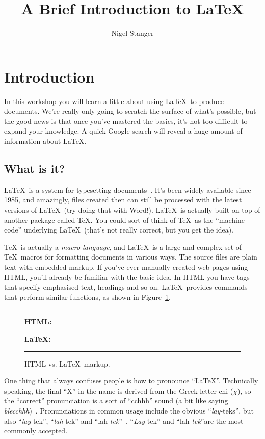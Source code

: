 \documentclass[12pt,a4paper,pdftex]{article}
\title{A Brief Introduction to \LaTeX}
\author{Nigel Stanger}
\begin{document}
\maketitle


\section{Introduction}
\label{sec:intro}

In this workshop you will learn a little about using \LaTeX\ to produce
documents. We're really only going to scratch the surface of what's
possible, but the good news is that once you've mastered the basics,
it's not too difficult to expand your knowledge. A quick Google search
will reveal a huge amount of information about \LaTeX.


\subsection{What is it?}
\label{sec:what}

\LaTeX\ is a system for typesetting documents~\cite{UsersGuide}. It's
been widely available since 1985, and amazingly, files created then can
still be processed with the latest versions of \LaTeX\ (try doing that
with Word!). \LaTeX\ is actually built on top of another package called
\TeX. You could sort of think of \TeX\ as the ``machine code''
underlying \LaTeX\ (that's not really correct, but you get the idea).

\TeX\ is actually a \emph{macro language}, and \LaTeX\ is a large and
complex set of \TeX\ macros for formatting documents in various ways.
The source files are plain text with embedded markup. If you've ever
manually created web pages using HTML, you'll already be familiar with
the basic idea. In HTML you have tags that specify emphasised text,
headings and so on. \LaTeX\ provides commands that perform similar
functions, as shown in Figure~\ref{fig:HTMLcomparison}.

\begin{figure}
	\hrule\medskip
	\textbf{HTML:}

	\bigskip
	
	\textbf{\LaTeX:}

	\hrule
	\caption{HTML vs. \LaTeX\ markup.}
	\label{fig:HTMLcomparison}
\end{figure}

One thing that always confuses people is how to pronounce ``\LaTeX''.
Technically speaking, the final ``X'' in the name is derived from the
Greek letter chi ($\chi$), so the ``correct'' pronunciation is a sort of
``cchhh'' sound (a bit like saying \emph{blecchhh})~\cite{TeXBook}.
Pronunciations in common usage include the obvious ``\emph{lay}-teks'',
but also ``\emph{lay}-tek'', ``\emph{lah}-tek'' and
``lah-\emph{tek}''~\cite{UsersGuide}. ``\emph{Lay}-tek''  and
``lah-\emph{tek}''are the most commonly accepted.
\end{document}
